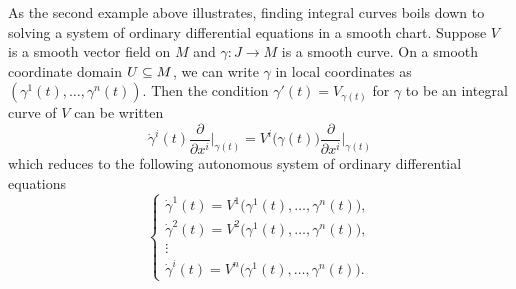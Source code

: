As the second example above illustrates, finding integral curves boils down to solving a system of ordinary differential equations in a smooth chart. Suppose $V$ is a smooth vector field on $M$ and $\gamma:J\to M$ is a smooth curve. On a smooth coordinate domain $U\subseteq M$, we can write $\gamma$ in local coordinates as $(\gamma^1(t),\dots,\gamma^n(t))$. Then the condition $\gamma'(t)=V_{\gamma(t)}$ for $\gamma$ to be an integral curve of $V$ can be written
\[\dot{\gamma}^i(t)\frac{\partial}{\partial x^i}\Big|_{\gamma(t)}=V^i\big(\gamma(t)\big)\frac{\partial}{\partial x^i}\Big|_{\gamma(t)}\]
which reduces to the following autonomous system of ordinary differential equations
\begin{equation}\label{integral cruve equation}
\left\{\begin{array}{c}
\dot{\gamma}^1(t)=V^1\big(\gamma^1(t),\dots,\gamma^n(t)\big),\\
\dot{\gamma}^2(t)=V^2\big(\gamma^1(t),\dots,\gamma^n(t)\big),\\
\vdots\\
\dot{\gamma}^i(t)=V^n\big(\gamma^1(t),\dots,\gamma^n(t)\big).
\end{array}\right. 
\end{equation}

